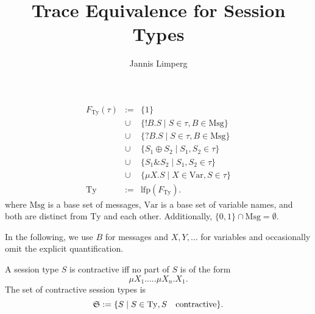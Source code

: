 \documentclass{llncs}
\newcommand*{\Msg}{\mathrm{Msg}}
\newcommand*{\Var}{\mathrm{Var}}
\newcommand*{\Ty}{\mathrm{Ty}}
\newcommand*{\Sy}{\mathfrak{S}}
\newcommand*{\lfp}{\mathrm{lfp}}
\newcommand*{\union}{\cup}
\newcommand*{\send}{\mathord{!}}
\newcommand*{\recv}{\mathord{?}}
\newcommand*{\echoice}{\oplus}
\newcommand*{\ichoice}{\mathop{\&}}
\newcommand*{\contractive}[1]{\text{$#1$ {\normalfont \rmfamily contractive}}}
\renewcommand*{\|}{\;|\;}
\begin{document}
\title{Trace Equivalence for Session Types}
\author{Jannis Limperg}
\maketitle

\begin{definition}
  \label{def:session_types}
  \begin{eqnarray*}
    F_{\Ty}(\tau)
      &:=&     \{1\} \\
      &\union& \{\send B.S \| S \in \tau, B \in \Msg\} \\
      &\union& \{\recv B.S \| S \in \tau, B \in \Msg\} \\
      &\union& \{S_1 \echoice S_2 \| S_1, S_2 \in \tau\} \\
      &\union& \{S_1 \ichoice S_2 \| S_1, S_2 \in \tau\} \\
      &\union& \{\mu X.S \| X \in \Var, S \in \tau\} \\
    \Ty &:=& \lfp(F_{\Ty}).
  \end{eqnarray*}
  where $\Msg$ is a base set of messages, $\Var$ is a base set of variable
  names, and both are distinct from $\Ty$ and each other. Additionally,
  $\{0, 1\} \cap \Msg = \emptyset$.

  In the following, we use $B$ for messages and $X, Y, \dots$ for variables and
  occasionally omit the explicit quantification.
\end{definition}

\begin{definition}[Contractivity]
  \label{def:contractivity}
  A session type $S$ is contractive iff no part of $S$ is of the form
  \begin{equation*}
    \mu X_1.\dots.\mu X_n.X_1.
  \end{equation*}
  The set of contractive session types is
  \begin{equation*}
    \Sy := \{S \| S \in \Ty, \contractive{S}\}.
  \end{equation*}
\end{definition}
\end{document}
